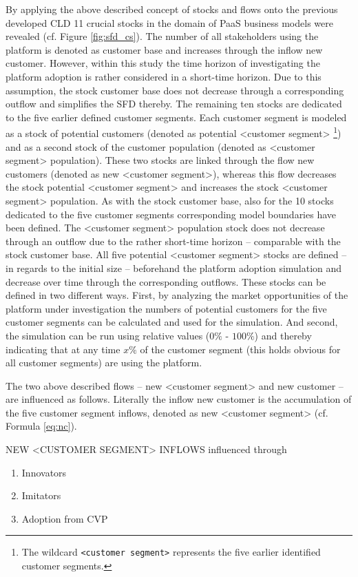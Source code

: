 By applying the above described concept of stocks and flows onto the previous developed \ac{CLD} 11 crucial stocks in the domain of \ac{PaaS} business models were revealed (cf. Figure \ref{fig:sfd_cs}). The number of all stakeholders using the platform is denoted as customer base and increases through the inflow new customer. However, within this study the time horizon of investigating the platform adoption is rather considered in a short-time horizon. Due to this assumption, the stock customer base does not decrease through a corresponding outflow and simplifies the \ac{SFD} thereby. The remaining ten stocks are dedicated to the five earlier defined customer segments. Each customer segment is modeled as a stock of potential customers (denoted as potential <customer segment> \footnote{The wildcard \texttt{<customer segment>} represents the five earlier identified customer segments.}) and as a second stock of the customer population (denoted as <customer segment> population). These two stocks are linked through the flow new customers (denoted as new <customer segment>), whereas this flow decreases the stock potential <customer segment> and increases the stock <customer segment> population. As with the stock customer base, also for the 10 stocks dedicated to the five customer segments corresponding model boundaries have been defined. The <customer segment> population stock does not decrease through an outflow due to the rather short-time horizon -- comparable with the stock customer base. All five potential <customer segment> stocks are defined -- in regards to the initial size -- beforehand the platform adoption simulation and decrease over time through the corresponding outflows. These stocks can be defined in two different ways. First, by analyzing the market opportunities of the platform under investigation the numbers of potential customers for the five customer segments can be calculated and used for the simulation. And second, the simulation can be run using relative values ($0\%$ - $100\%$) and thereby indicating that at any time $x\%$ of the customer segment (this holds obvious for all customer segments) are using the platform.

The two above described flows -- new <customer segment> and new customer -- are influenced as follows. Literally the inflow new customer is the accumulation of the five customer segment inflows, denoted as new <customer segment> (cf. Formula \ref{eq:nc}).

NEW <CUSTOMER SEGMENT> INFLOWS influenced through
\begin{enumerate}
	\item	Innovators
	\item	Imitators
	\item	Adoption from CVP
\end{enumerate}


